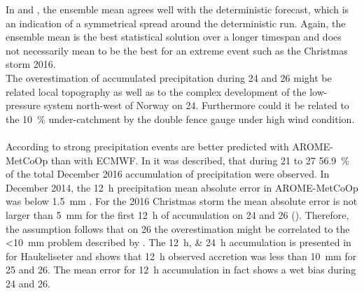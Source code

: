In  and , the ensemble mean agrees well with the deterministic forecast, which is an indication of a symmetrical spread around the deterministic run. Again, the ensemble mean is the best statistical solution over a longer timespan and does not necessarily mean to be the best for an extreme event such as the Christmas storm 2016. 
\\ 
The overestimation of accumulated precipitation during \num{24} and \SI{26}{\dec} might be related 
local topography as well as to the complex development of the low-pressure system north-west of Norway on \SI{24}{\dec}. Furthermore could it be related to the \SI{10}{\percent} under-catchment by the double fence gauge under high wind condition.
\\
\\
According to \citet{muller_arome-metcoop:_2017} strong precipitation events are better predicted with AROME-MetCoOp than with ECMWF. In  it was described, that during \num{21} to \SI{27}{\dec} \SI{56.9}{\percent} of the total December 2016 accumulation of precipitation were observed. 
In December 2014, the \SI{12}{\hour} precipitation mean absolute error in AROME-MetCoOp was below \SI{1.5}{\mm} \citep{muller_arome-metcoop:_2017}. For the 2016 Christmas storm the mean absolute error is not larger than \SI{5}{\mm} for the first \SI{12}{\hour} of accumulation on \num{24} and \SI{26}{\dec}
(). Therefore, the assumption follows that on \SI{26}{\dec} the overestimation might be correlated to the <\SI{10}{\mm} problem described by \citet{muller_arome-metcoop:_2017}. The \SIlist{12;24}{\hour} accumulation is presented in  for Haukeliseter and shows that \SI{12}{\hour} observed accretion was less than \SI{10}{\mm} for 
\num{25} and \SI{26}{\dec}.
The mean error for \SI{12}{\hour} accumulation in fact shows a wet bias during \num{24} and \SI{26}{\dec}.


